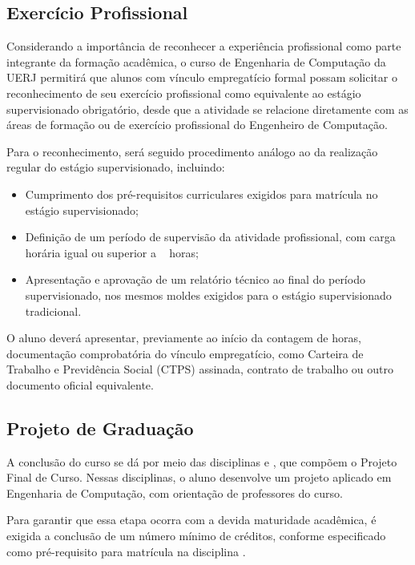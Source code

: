 \subsection{Exercício Profissional}
Considerando a importância de reconhecer a experiência profissional como parte integrante da formação acadêmica, o curso de Engenharia de Computação da UERJ permitirá que alunos com vínculo empregatício formal possam solicitar o reconhecimento de seu exercício profissional como equivalente ao estágio supervisionado obrigatório, desde que a atividade se relacione diretamente com as áreas de formação ou de exercício profissional do Engenheiro de Computação.

Para o reconhecimento, será seguido procedimento análogo ao da realização regular do estágio supervisionado, incluindo:

\begin{itemize}
    \item Cumprimento dos pré-requisitos curriculares exigidos para matrícula no estágio supervisionado;
    \item Definição de um período de supervisão da atividade profissional, com carga horária igual ou superior a \EstSupCH~ horas;
    \item Apresentação e aprovação de um relatório técnico ao final do período supervisionado, nos mesmos moldes exigidos para o estágio supervisionado tradicional. \end{itemize}

O aluno deverá apresentar, previamente ao início da contagem de horas, documentação comprobatória do vínculo empregatício, como Carteira de Trabalho e Previdência Social (CTPS) assinada, contrato de trabalho ou outro documento oficial equivalente.



\subsection{Projeto de Graduação}

A conclusão do curso se dá por meio das disciplinas \textbf{\ProjA} e \textbf{\ProjB}, que compõem o Projeto Final de Curso. Nessas disciplinas, o aluno desenvolve um projeto aplicado em Engenharia de Computação, com orientação de professores do curso.

Para garantir que essa etapa ocorra com a devida maturidade acadêmica, é exigida a conclusão de um número mínimo de créditos, conforme especificado como pré-requisito para matrícula na disciplina \textbf{\ProjA}.

